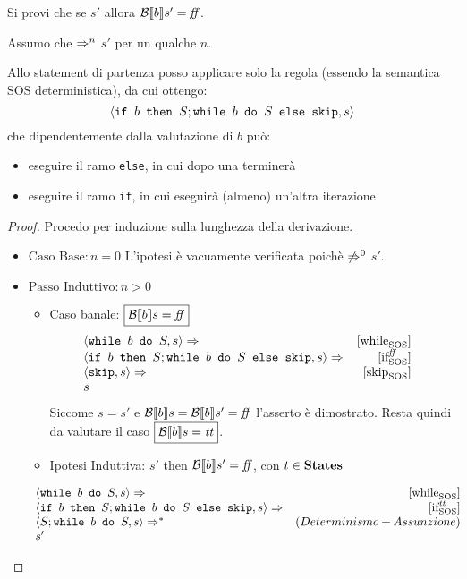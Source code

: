 {
 Si provi che se  \Rar{*} $s'$ allora
 $\B{b}' = \semfalse$.
}
{
Assumo che  $\Rar{n}$ $s'$ per un qualche $n$.

Allo statement di partenza posso applicare solo la regola \whileSOS
(essendo la semantica SOS deterministica), da cui ottengo:
$$
  \confSs{\ifABC{b}{S; \wbS{b}{S}}{\skipForFriends}}{s} 
$$
che dipendentemente dalla valutazione di $b$ può:
\begin{itemize}
  \item eseguire il ramo \texttt{else}, in cui dopo una 
    \skipForFriends{} terminerà 
  \item eseguire il ramo \texttt{if}, in cui eseguirà (almeno) 
    un'altra iterazione
\end{itemize}
\begin{proof}
Procedo per induzione sulla lunghezza della derivazione.

\begin{itemize}
  \item $\boxed{\text{Caso Base}: n = 0}$ L'ipotesi è vacuamente verificata
    poichè  $\not\Rar{0}$ $s'$.

  \item $\boxed{\text{Passo Induttivo}: n > 0}$
    \begin{itemize}
      \item Caso banale: $\boxed{\B{b} = \semfalse}$
        $$
        \begin{array}{lrr}
        \confSs{\wbS{b}{S}}{s} \Rar{} & \whileSOS & \\
        \confSs{\ifABC{b}{S; \wbS{b}{S}}{\skipForFriends}}{s}
            \Rar{} & \ifffSOS & \\
        \confSs{\skipForFriends}{s} \Rar{} & \skipSOS & \\
        s & & \\
        \end{array}
        $$
        Siccome $s = s'$ e $\B{b} = \B{b}' = \semfalse$ l'asserto è dimostrato.
        Resta quindi da valutare il caso $\boxed{\B{b} = \semtrue}$.
      \item Ipotesi Induttiva:   $s'$ then
        $\B{b}' = \semfalse$, con $t\in\states$
    \end{itemize}
    $$
    \begin{array}{lrr}
    \confSs{\wbS{b}{S}}{s} \Rar{} & \whileSOS & \\
    \confSs{\ifABC{b}{S; \wbS{b}{S}}{\skipForFriends}}{s} \Rar{} & \ifttSOS & \\
    \confSs{S; \wbS{b}{S}}{s} \Rar{*} & (Determinismo + Assunzione) & \\
    s' & & \\
    \end{array}
    $$


\end{itemize}
\end{proof}}
